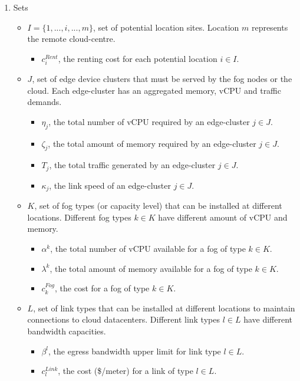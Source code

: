 \documentclass[10pt,journal,compsoc]{IEEEtran}
\begin{document}
\begin{enumerate}
\item Sets
\begin{itemize}
\item $ \textit{I} = \{ 1,...,i,...,m \}$, set of potential location sites. Location $m$ represents the remote cloud-centre.
\begin{itemize}
\item $c_i^{Rent}$, the renting cost for each potential location $i \in I$.
\end{itemize}
\item $\textit{J}$, set of edge device clusters that must be served by the fog nodes or the cloud. Each edge-cluster has an aggregated memory, vCPU and traffic demands.
\begin{itemize}
\item $\eta_j$, the total number of vCPU required by an edge-cluster $j \in J$.
\item $\zeta_j$, the total amount of memory required by an edge-cluster $j \in J$.
\item $T_j$, the total traffic generated by an edge-cluster $j \in J$.
\item $\kappa_j$, the link speed of an edge-cluster $j \in J$.
\end{itemize}

\item $K$, set of fog types (or capacity level) that can be installed at different locations. Different fog types $k \in K$ have different amount of vCPU and memory.
\begin{itemize}
\item $\alpha^k$, the total number of vCPU available for a fog of type $k \in K$.
\item $\lambda^k$, the total amount of memory available for a fog of type $k \in K$.
\item $c_k^{Fog}$, the cost for a fog of type $k \in K$.
\end{itemize} 
\item $L$, set of link types that can be installed at different locations to maintain connections to cloud datacenters. Different link types $l \in L$ have different bandwidth capacities. 
\begin{itemize}
\item $\beta^l$, the egress bandwidth upper limit for link type $l \in L$.
\item $c_l^{Link}$, the cost (\$/meter) for a link of type $l \in L$.
\end{itemize}
\end{itemize}



\end{enumerate}
\end{document}
